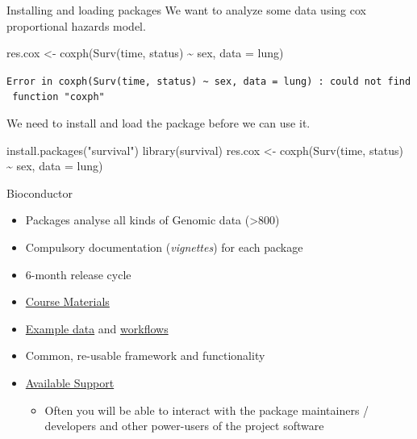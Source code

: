 \documentclass[
  ignorenonframetext,
]{beamer}
\newenvironment{Shaded}{\begin{snugshade}}{\end{snugshade}}
\newcommand{\AttributeTok}[1]{\textcolor[rgb]{0.77,0.63,0.00}{#1}}
\newcommand{\FunctionTok}[1]{\textcolor[rgb]{0.00,0.00,0.00}{#1}}
\newcommand{\NormalTok}[1]{#1}
\newcommand{\OtherTok}[1]{\textcolor[rgb]{0.56,0.35,0.01}{#1}}
\newcommand{\SpecialCharTok}[1]{\textcolor[rgb]{0.00,0.00,0.00}{#1}}
\newcommand{\StringTok}[1]{\textcolor[rgb]{0.31,0.60,0.02}{#1}}
\providecommand{\tightlist}{%
  \setlength{\itemsep}{0pt}\setlength{\parskip}{0pt}}
\begin{document}
\begin{frame}[fragile]{Installing and loading packages}
\protect\hypertarget{installing-and-loading-packages}{}
We want to analyze some data using cox proportional hazards model.

\begin{Shaded}
\begin{Highlighting}[]
\NormalTok{res.cox }\OtherTok{\textless{}{-}} \FunctionTok{coxph}\NormalTok{(}\FunctionTok{Surv}\NormalTok{(time, status) }\SpecialCharTok{\textasciitilde{}}\NormalTok{ sex, }\AttributeTok{data =}\NormalTok{ lung)}
\end{Highlighting}
\end{Shaded}

\texttt{Error\ in\ coxph(Surv(time,\ status)\ \textasciitilde{}\ sex,\ data\ =\ lung)\ :\ could\ not\ find\ function\ "coxph"}

We need to install and load the package before we can use it.

\begin{Shaded}
\begin{Highlighting}[]
\FunctionTok{install.packages}\NormalTok{(}\StringTok{"survival"}\NormalTok{)}
\FunctionTok{library}\NormalTok{(survival)}
\NormalTok{res.cox }\OtherTok{\textless{}{-}} \FunctionTok{coxph}\NormalTok{(}\FunctionTok{Surv}\NormalTok{(time, status) }\SpecialCharTok{\textasciitilde{}}\NormalTok{ sex, }\AttributeTok{data =}\NormalTok{ lung)}
\end{Highlighting}
\end{Shaded}
\end{frame}

\begin{frame}{Bioconductor}
\protect\hypertarget{bioconductor}{}
\begin{itemize}
\tightlist
\item
  Packages analyse all kinds of Genomic data (\textgreater800)
\item
  Compulsory documentation (\emph{vignettes}) for each package
\item
  6-month release cycle
\item
  \href{http://bioconductor.org/help/course-materials/}{Course
  Materials}
\item
  \href{http://bioconductor.org/packages/release/BiocViews.html\#___ExperimentData}{Example
  data} and \href{http://bioconductor.org/help/workflows/}{workflows}
\item
  Common, re-usable framework and functionality
\item
  \href{https://support.bioconductor.org/}{Available Support}

  \begin{itemize}
  \tightlist
  \item
    Often you will be able to interact with the package maintainers /
    developers and other power-users of the project software
  \end{itemize}
\end{itemize}
\end{frame}
\end{document}
